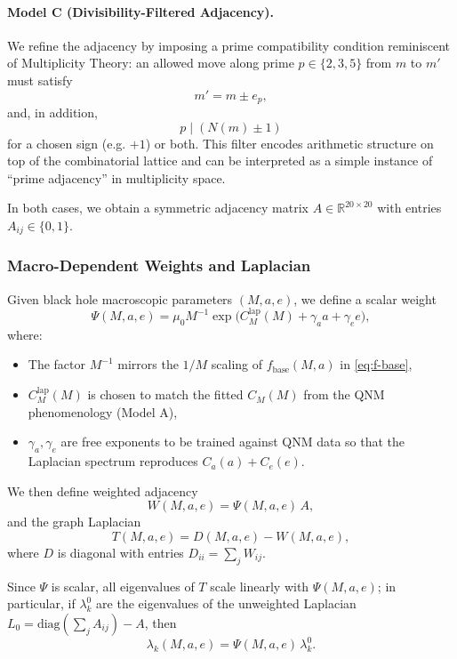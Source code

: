\documentclass[11pt]{article}
\begin{document}
\paragraph{Model C (Divisibility-Filtered Adjacency).}

We refine the adjacency by imposing a prime compatibility condition reminiscent of Multiplicity Theory:
an allowed move along prime $p\in\{2,3,5\}$ from $m$ to $m'$ must satisfy
\[
  m' = m \pm e_p,
\]
and, in addition,
\[
  p \mid (N(m) \pm 1)
\]
for a chosen sign (e.g. $+1$) or both. This filter encodes arithmetic structure on top of the combinatorial lattice and can be interpreted as a simple instance of ``prime adjacency'' in multiplicity space.

In both cases, we obtain a symmetric adjacency matrix $A\in \mathbb{R}^{20\times 20}$ with entries $A_{ij}\in\{0,1\}$.

\subsubsection{Macro-Dependent Weights and Laplacian}

Given black hole macroscopic parameters $(M,a,e)$, we define a scalar weight
\begin{equation}
  \Psi(M,a,e) = \mu_0 M^{-1} \exp\!\big(C_M^{\text{lap}}(M) + \gamma_a a + \gamma_e e\big),
  \label{eq:Psi}
\end{equation}
where:
\begin{itemize}
  \item The factor $M^{-1}$ mirrors the $1/M$ scaling of $f_{\text{base}}(M,a)$ in \eqref{eq:f-base},
  \item $C_M^{\text{lap}}(M)$ is chosen to match the fitted $C_M(M)$ from the QNM phenomenology (Model A),
  \item $\gamma_a,\gamma_e$ are free exponents to be trained against QNM data so that the Laplacian spectrum reproduces $C_a(a)+C_e(e)$.
\end{itemize}

We then define weighted adjacency
\[
  W(M,a,e) = \Psi(M,a,e)\,A,
\]
and the graph Laplacian
\begin{equation}
  T(M,a,e) = D(M,a,e) - W(M,a,e),
\end{equation}
where $D$ is diagonal with entries $D_{ii} = \sum_j W_{ij}$.

Since $\Psi$ is scalar, all eigenvalues of $T$ scale linearly with $\Psi(M,a,e)$; in particular, if $\lambda_k^0$ are the eigenvalues of the unweighted Laplacian $L_0 = \text{diag}(\sum_j A_{ij}) - A$, then
\[
  \lambda_k(M,a,e) = \Psi(M,a,e)\,\lambda_k^0.
\]
\end{document}
